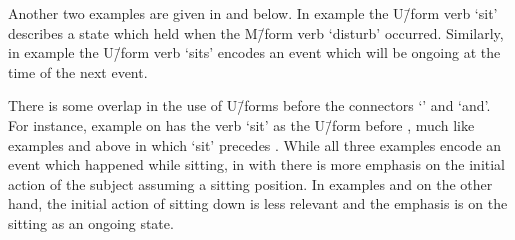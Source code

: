 Another two examples are given in  and  below.
In example  the U\=/form verb  `sit'
describes a state which held when the M\=/form verb  `disturb' occurred.
Similarly, in example  the U\=/form verb  `sits'
encodes an event which will be ongoing at the time of the next event.

\begin{exe}
\vspace{4pt}
	\label{ex:130825-6, 21.34}
	\label{ex:130913-1, 2.43}
\end{exe}

There is some overlap in the use of U\=/forms before the connectors  `' and  `and'.
For instance, example  on 
has the verb  `sit' as the U\=/form before ,
much like examples  and  above
in which  `sit' precedes .
While all three examples encode an event which happened while sitting,
in  with  there is more emphasis
on the initial action of the subject assuming a sitting position.
In examples  and  on the other hand,
the initial action of sitting down is less relevant
and the emphasis is on the sitting as an ongoing state.

